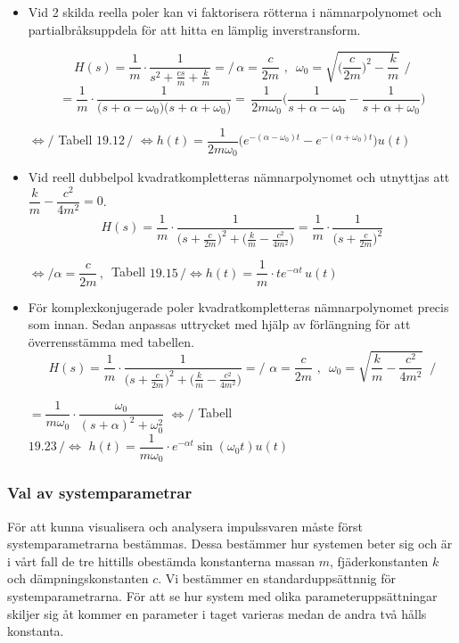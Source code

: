 \begin{itemize}
    \item Vid 2 skilda reella poler kan vi faktorisera rötterna i nämnarpolynomet och partialbråksuppdela för att hitta en lämplig inverstransform.
    
    $$H(s)=\frac{1}{m} \cdot \frac{1}{s^2+\frac{cs}{m}+\frac{k}{m}}=\Bigg/ \,\alpha=\frac{c}{2m}\,\,,\,\,\, \omega_0=\sqrt{\bigg(\frac{c}{2m}\bigg)^2-\frac{k}{m}} \,\,\Bigg/$$
    $$=\frac{1}{m} \cdot \frac{1}{\big(s+\alpha-\omega_0\big)\big(s+\alpha+\omega_0\big)}  = \, \frac{1}{2m\omega_0} \Bigg(\frac{1}{s+\alpha-\omega_0}-\frac{1}{s+\alpha+\omega_0}\Bigg)$$
    \begin{center}$ \Longleftrightarrow \bigg/$ Tabell $19.12\,\bigg/$ 
    $\Longleftrightarrow h(t)=\dfrac{1}{2m\omega_0}\bigg(e^{-(\alpha-\omega_0)t}-e^{-(\alpha+\omega_0)t}\bigg)u(t)$ \end{center}
    
    \item Vid reell dubbelpol kvadratkompletteras nämnarpolynomet och utnyttjas att
    $\dfrac{k}{m}-\dfrac{c^2}{4m^2}=0$.
    $$ H(s)= \frac{1}{m} \cdot\frac{1}{\big(s+\frac{c}{2m}\big)^2+\big(\frac{k}{m}-\frac{c^2}{4m^2}\big)} = \frac{1}{m} \cdot \frac{1}{\big(s+\frac{c}{2m}\big)^2}$$
    \begin{center}
    $ \Longleftrightarrow \bigg/ \alpha=\dfrac{c}{2m}\,,\,$ Tabell $19.15\,\bigg/ \Longleftrightarrow h(t)=\dfrac{1}{m} \cdot te^{-\alpha t}\,u(t)$
    \end{center}
    
    \item För komplexkonjugerade poler kvadratkompletteras nämnarpolynomet precis som innan. Sedan anpassas uttrycket med hjälp av förlängning för att överrensstämma med tabellen.
    $$H(s)=\frac{1}{m} \cdot \frac{1}{\big(s+\frac{c}{2m}\big)^2+\big(\frac{k}{m}-\frac{c^2}{4m^2}\big)} = \Bigg/\, \,\alpha=\frac{c}{2m}\,\,,\,\,\,\omega_0=\sqrt{\frac{k}{m}-\frac{c^2}{4m^2}} \,\,\,\Bigg/ $$
    \begin{center}
    $=\dfrac{1}{m\omega_0} \cdot \dfrac{\omega_0}{(s+\alpha)^2+\omega_0^2} \,\,\Longleftrightarrow \bigg/$ Tabell $19.23\,\bigg/\Longleftrightarrow\,\, h(t)=\dfrac{1}{m\omega_0} \cdot e^{-\alpha t} \sin(\omega_0 t)u(t)$
    \end{center}
\end{itemize}

\subsubsection{Val av systemparametrar}
För att kunna visualisera och analysera impulssvaren måste först systemparametrarna bestämmas. Dessa bestämmer hur systemen beter sig och är i vårt fall de tre hittills obestämda konstanterna massan  $m$, fjäderkonstanten $k$ och dämpningskonstanten $c$. Vi bestämmer en standarduppsättnnig för systemparametrarna. För att se hur system med olika parameteruppsättningar skiljer sig åt kommer en parameter i taget varieras medan de andra två hålls konstanta.

